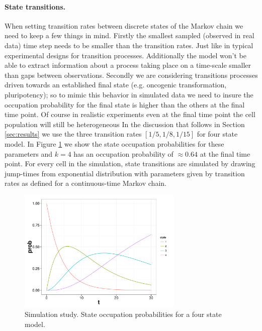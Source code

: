 \paragraph{State transitions.}
\label{sec:state-transitions}

When setting transition rates between discrete states of the Markov chain we need to keep a few things in mind. Firstly the smallest sampled (observed in real data) time step needs to be smaller than the transition rates. Just like in typical experimental designs for transition processes. Additionally the model won't be able to extract information about a process taking place on a time-scale smaller than gaps between observations. Secondly we are considering transitions processes driven towards an established final state (e.g. oncogenic transformation, pluripotency); so to mimic this behavior in simulated data we need to insure the occupation probability for the final state is higher than the others at the final time point. Of course in realistic experiments even at the final time point the cell population will still be heterogeneous In the discussion that follows in Section \ref{sec:results} we use the three transition rates $[1/5, 1/8, 1/15]$ for four state model. In Figure \ref{fig:transition-rates} we show the state occupation probabilities for these parameters and $k=4$ has an occupation probability of $\approx 0.64$ at the final time point. For every cell in the simulation, state transitions are simulated by drawing jump-times from exponential distribution with parameters given by transition rates as defined for a continuous-time Markov chain.

\begin{figure}
  \centering
  \includegraphics[width=0.7\textwidth]{pics/trans-rates.pdf}
  \caption{Simulation study. State occupation probabilities for a four state model.}
  \label{fig:transition-rates}
\end{figure}

